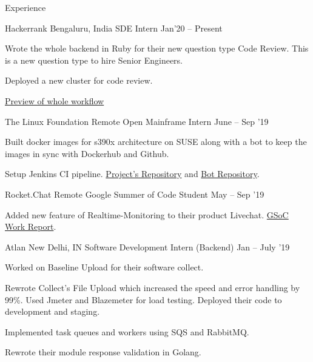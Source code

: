\documentclass{resume} %
\begin{document}
\begin{rSection}{Experience}

  \begin{rWorkSection}{Hackerrank}
                     {Bengaluru, India}
                     {SDE Intern}
                     {Jan'20 -- Present} {
    \item Wrote the whole backend in Ruby for their new question type Code Review. This is a new question type to hire Senior Engineers. 
    \item Deployed a new cluster for code review.
    \item \href{https://drive.google.com/file/d/1o1cM7VUnvcKaShnM1XLyEChmaIrFrKEh/view}{Preview of whole workflow}
  }
  \end{rWorkSection}

  \begin{rWorkSection}{The Linux Foundation}
                           {Remote}
                           {Open Mainframe Intern}
                           {June -- Sep '19}
  {
    \item Built docker images for s390x architecture on SUSE along with a bot to keep the images in sync with Dockerhub and Github.   
    \item Setup Jenkins CI pipeline. \href{https://github.com/openmainframeproject-internship/DockerHub-Development-Stacks/}{Project's Repository} and \href{https://github.com/knrt10/docker-hub-development-stacks-bot/}{Bot Repository}.  
  }                         
  \end{rWorkSection}

  \begin{rWorkSection}{Rocket.Chat}
                      {Remote}
                      {Google Summer of Code Student}
                      {May -- Sep '19}
  {
    \item Added new feature of Realtime-Monitoring to their product Livechat. \href{http://bit.ly/2kGqWt2}{GSoC Work Report}.
  }
  \end{rWorkSection}

  \begin{rWorkSection}{Atlan}
                     {New Delhi, IN}
                     {Software Development Intern (Backend)}
                     {Jan -- July '19}
  {
    \item Worked on Baseline Upload for their software collect. 
    \item Rewrote Collect's File Upload which increased the speed and error handling by 99\%. Used Jmeter and Blazemeter for load testing. Deployed their code to development and staging.
    \item Implemented task queues and workers using SQS and RabbitMQ.
    \item Rewrote their module response validation in Golang.
  }
  \end{rWorkSection}
\end{rSection}
\end{document}
